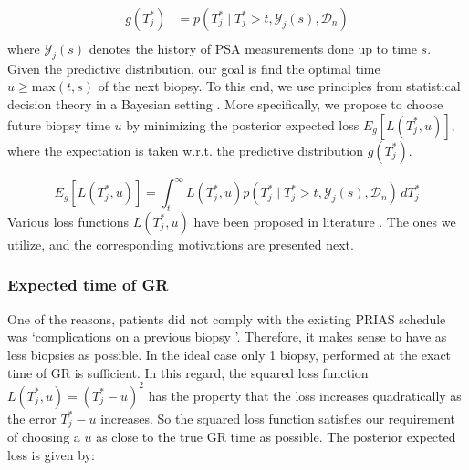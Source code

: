\begin{equation}
\label{eq : dyn_dist_fail_time}
\begin{split}
g(T^*_j) &= p(T^*_j \mid T^*_j > t, \mathcal{Y}_j(s), \mathcal{D}_n)\\
\end{split}
\end{equation}
where $\mathcal{Y}_j(s)$ denotes the history of PSA measurements done up to time $s$. Given the predictive distribution, our goal is find the optimal time $u \geq \text{max}(t,s)$ of the next biopsy. To this end, we use principles from statistical decision theory in a Bayesian setting \citep{bergerDecisionTheory,robertBayesianChoice}. More specifically, we propose to choose future biopsy time $u$ by minimizing the posterior expected loss $E_g[L(T^*_j, u)]$, where the expectation is taken w.r.t. the predictive distribution $g(T^*_j)$. 

\begin{equation*}
E_g[L(T^*_j, u)] = \int_t^\infty L(T^*_j, u) p(T^*_j \mid T^*_j > t, \mathcal{Y}_j(s), \mathcal{D}_n) \,dT^*_j
\end{equation*}
Various loss functions $L(T^*_j, u)$ have been proposed in literature \citep{robertBayesianChoice}. The ones we utilize, and the corresponding motivations are presented next.

\subsubsection{Expected time of GR}
\label{subsubsec : exp_fail_time}
One of the reasons, patients did not comply with the existing PRIAS schedule was \textquoteleft complications on a previous biopsy \textquoteright. Therefore, it makes sense to have as less biopsies as possible. In the ideal case only 1 biopsy, performed at the exact time of GR is sufficient. In this regard, the squared loss function $L(T^*_j, u) = (T^*_j - u)^2$ has the property that the loss increases quadratically as the error $T^*_j - u$ increases. So the squared loss function satisfies our requirement of choosing a $u$ as close to the true GR time as possible. The posterior expected loss is given by:

